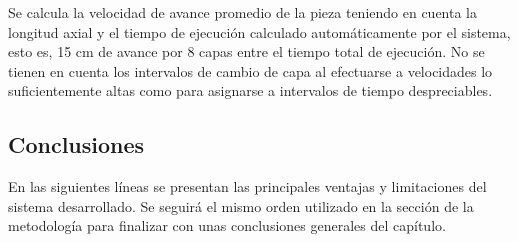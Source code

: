 \begin{table}[h!]
\centering
{}
\caption{Ensayo de control de velocidad. Tiempos registrados}
\label{tab: ensayo control velocidad tiempos}
\end{table}

Se calcula la velocidad de avance promedio de la pieza teniendo en cuenta la longitud axial y el tiempo de ejecución calculado automáticamente por el sistema, esto es, 15 cm de avance por 8 capas entre el tiempo total de ejecución. No se tienen en cuenta los intervalos de cambio de capa al efectuarse a velocidades lo suficientemente altas como para asignarse a intervalos de tiempo despreciables.

\subsection{Conclusiones}
En las siguientes líneas se presentan las principales ventajas y limitaciones del sistema desarrollado. Se seguirá el mismo orden utilizado en la sección de la metodología para finalizar con unas conclusiones generales del capítulo.

